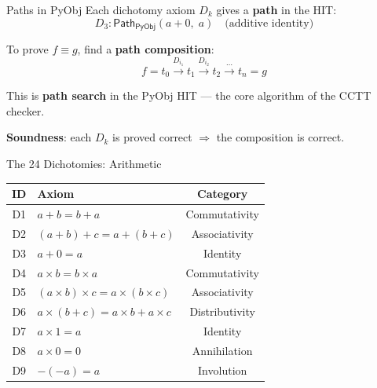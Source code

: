 \documentclass[aspectratio=169,11pt]{beamer}
\newcommand{\Path}{\mathsf{Path}}
\newcommand{\PyObj}{\mathsf{PyObj}}
\begin{document}
\begin{frame}{Paths in PyObj}
Each dichotomy axiom $D_k$ gives a \textbf{path} in the HIT:
\[
D_3 : \Path_{\PyObj}(a + 0,\; a) \quad \text{(additive identity)}
\]

\vspace{0.3em}
To prove $f \equiv g$, find a \textbf{path composition}:
\[
f = t_0 \xrightarrow{D_{i_1}} t_1 \xrightarrow{D_{i_2}} t_2 \xrightarrow{\cdots} t_n = g
\]

\vspace{0.5em}
This is \textbf{path search} in the PyObj HIT --- the core algorithm of the CCTT checker.

\vspace{0.3em}
\textbf{Soundness}: each $D_k$ is proved correct $\Rightarrow$ the composition is correct.
\end{frame}

\begin{frame}{The 24 Dichotomies: Arithmetic}
\small
\begin{center}
\begin{tabular}{clc}
\toprule
\textbf{ID} & \textbf{Axiom} & \textbf{Category} \\
\midrule
D1 & $a + b = b + a$ & Commutativity \\
D2 & $(a+b)+c = a+(b+c)$ & Associativity \\
D3 & $a + 0 = a$ & Identity \\
D4 & $a \times b = b \times a$ & Commutativity \\
D5 & $(a \times b) \times c = a \times (b \times c)$ & Associativity \\
D6 & $a \times (b+c) = a \times b + a \times c$ & Distributivity \\
D7 & $a \times 1 = a$ & Identity \\
D8 & $a \times 0 = 0$ & Annihilation \\
D9 & $-(-a) = a$ & Involution \\
\bottomrule
\end{tabular}
\end{center}
\end{frame}
\end{document}

